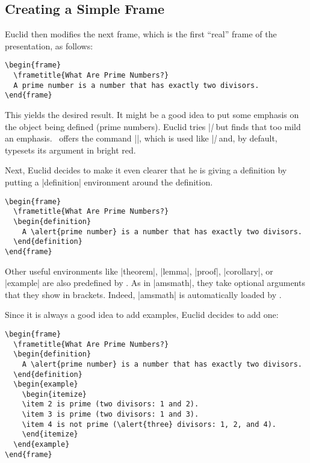\subsection{Creating a Simple Frame}

Euclid then modifies the next frame, which is the first ``real'' frame of the presentation, as follows:
\begin{verbatim}
\begin{frame}
  \frametitle{What Are Prime Numbers?}
  A prime number is a number that has exactly two divisors.
\end{frame}
\end{verbatim}
This yields the desired result. It might be a good idea to put some emphasis on the object being defined (prime numbers). Euclid tries |\emph| but finds that too mild an emphasis. \beamer\ offers the command |\alert|, which is used like |\emph| and, by default, typesets its argument in bright red.

Next, Euclid decides to make it even clearer that he is giving a definition by putting a |definition| environment around the definition.
\begin{verbatim}
\begin{frame}
  \frametitle{What Are Prime Numbers?}
  \begin{definition}
    A \alert{prime number} is a number that has exactly two divisors.
  \end{definition}
\end{frame}
\end{verbatim}

Other useful environments like |theorem|, |lemma|, |proof|, |corollary|, or |example| are also predefined by \beamer. As in |amsmath|, they take optional arguments that they show in brackets. Indeed, |amsmath| is automatically loaded by \beamer.

Since it is always a good idea to add examples, Euclid decides to add one:
\begin{verbatim}
\begin{frame}
  \frametitle{What Are Prime Numbers?}
  \begin{definition}
    A \alert{prime number} is a number that has exactly two divisors.
  \end{definition}
  \begin{example}
    \begin{itemize}
    \item 2 is prime (two divisors: 1 and 2).
    \item 3 is prime (two divisors: 1 and 3).
    \item 4 is not prime (\alert{three} divisors: 1, 2, and 4).
    \end{itemize}
  \end{example}
\end{frame}
\end{verbatim}


